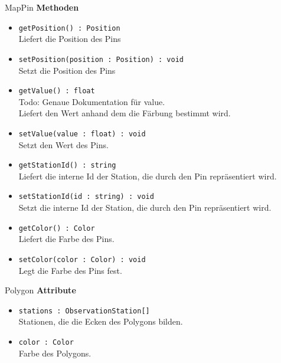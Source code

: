     \begin{Class}{MapPin}
        \textbf{Methoden}
        \begin{itemize}
            \item \texttt{getPosition() : Position}
            \\ Liefert die Position des Pins
            \item \texttt{setPosition(position : Position) : void}
            \\ Setzt die Position des Pins

            \bigskip
            \item \texttt{getValue() : float}
            \\ Todo: Genaue Dokumentation für value.
            \\ Liefert den Wert anhand dem die Färbung bestimmt wird.
            \item \texttt{setValue(value : float) : void}
            \\ Setzt den Wert des Pins.

            \bigskip
            \item \texttt{getStationId() : string}
            \\ Liefert die interne Id der Station, die durch den Pin repräsentiert wird.
            \item \texttt{setStationId(id : string) : void}
            \\ Setzt die interne Id der Station, die durch den Pin repräsentiert wird.

            \bigskip
            \item \texttt{getColor() : Color}
            \\ Liefert die Farbe des Pins.
            \item \texttt{setColor(color : Color) : void}
            \\ Legt die Farbe des Pins fest.
        \end{itemize}
    \end{Class}

    \begin{Class}{Polygon}
        \textbf{Attribute}
        \begin{itemize}
            \item \texttt{stations : ObservationStation[]}
            \\ Stationen, die die Ecken des Polygons bilden.
            \item \texttt{color : Color}
            \\ Farbe des Polygons.
        \end{itemize}
    \end{Class}


